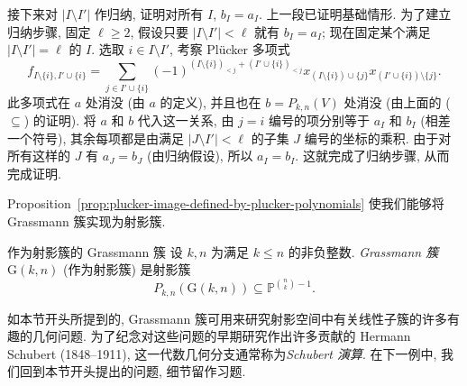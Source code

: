 \begin{Proof}
接下来对 $|I\setminus I'|$ 作归纳, 证明对所有 $I$, $b_{I}=a_{I}$. 上一段已证明基础情形. 为了建立归纳步骤, 固定 $\ell\ge2$, 假设只要 $|I\setminus I'|<\ell$ 就有 $b_{I}=a_{I}$; 现在固定某个满足 $|I\setminus I'|=\ell$ 的 $I$. 选取 $i\in I\setminus I'$, 考察 Plücker 多项式
\[
  f_{I\setminus\{i\},I'\cup\{i\}}
  =\sum_{j\in I'\cup\{i\}}(-1)^{(I\setminus\{i\})_{<j}+(I'\cup\{i\})_{<j}}
    x_{(I\setminus\{i\})\cup\{j\}}x_{(I'\cup\{i\})\setminus\{j\}}.
\]
此多项式在 $a$ 处消没 (由 $a$ 的定义), 并且也在 $b=P_{k,n}(V)$ 处消没 (由上面的 ($\subseteq$) 的证明). 将 $a$ 和 $b$ 代入这一关系, 由 $j=i$ 编号的项分别等于 $a_{I}$ 和 $b_{I}$ (相差一个符号), 其余每项都是由满足 $|J\setminus I'|<\ell$ 的子集 $J$ 编号的坐标的乘积. 由于对所有这样的 $J$ 有 $a_{J}=b_{J}$ (由归纳假设), 所以 $a_{I}=b_{I}$. 这就完成了归纳步骤, 从而完成证明.
\end{Proof}

Proposition~\ref{prop:plucker-image-defined-by-plucker-polynomials} 使我们能够将 Grassmann 簇实现为射影簇.

\begin{Definition}{作为射影簇的 Grassmann 簇}\leavevmode\label{def:grassmannian-as-projective-variety}
设 $k,n$ 为满足 $k\le n$ 的非负整数. \emph{Grassmann 簇} $\mathrm{G}(k,n)$ (作为射影簇) 是射影簇
\[
  P_{k,n}(\mathrm{G}(k,n))\subseteq\mathbb{P}^{\binom{n}{k}-1}.
\]
\end{Definition}

如本节开头所提到的, Grassmann 簇可用来研究射影空间中有关线性子簇的许多有趣的几何问题. 为了纪念对这些问题的早期研究作出许多贡献的 Hermann Schubert (1848--1911), 这一代数几何分支通常称为\emph{Schubert 演算}. 在下一例中, 我们回到本节开头提出的问题, 细节留作习题.

